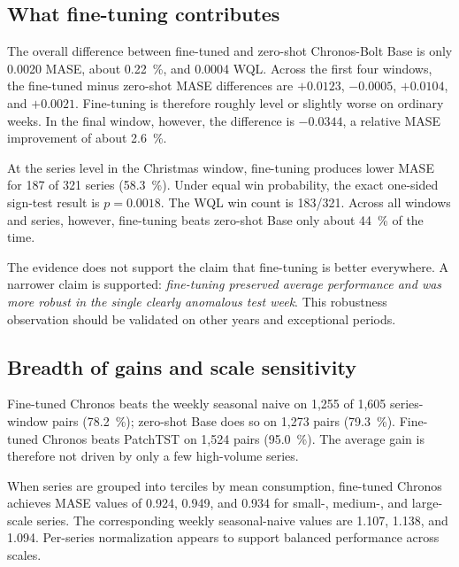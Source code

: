 \documentclass[11pt,a4paper]{article}
\begin{document}
\subsection{What fine-tuning contributes}

The overall difference between fine-tuned and zero-shot Chronos-Bolt Base is only 0.0020 MASE,
about \SI{0.22}{\percent}, and 0.0004 WQL. Across the first four windows, the fine-tuned minus
zero-shot MASE differences are $+0.0123$, $-0.0005$, $+0.0104$, and $+0.0021$. Fine-tuning is
therefore roughly level or slightly worse on ordinary weeks. In the final window, however, the
difference is $-0.0344$, a relative MASE improvement of about \SI{2.6}{\percent}.

At the series level in the Christmas window, fine-tuning produces lower MASE for 187 of 321 series
(\SI{58.3}{\percent}). Under equal win probability, the exact one-sided sign-test result is
$p=0.0018$. The WQL win count is 183/321. Across all windows and series, however, fine-tuning beats
zero-shot Base only about \SI{44}{\percent} of the time.

\begin{caution}
  The evidence does not support the claim that fine-tuning is better everywhere. A narrower claim
  is supported: \emph{fine-tuning preserved average performance and was more robust in the single
  clearly anomalous test week}. This robustness observation should be validated on other years and
  exceptional periods.
\end{caution}

\subsection{Breadth of gains and scale sensitivity}

Fine-tuned Chronos beats the weekly seasonal naive on 1,255 of 1,605 series-window pairs
(\SI{78.2}{\percent}); zero-shot Base does so on 1,273 pairs (\SI{79.3}{\percent}). Fine-tuned
Chronos beats PatchTST on 1,524 pairs (\SI{95.0}{\percent}). The average gain is therefore not
driven by only a few high-volume series.

When series are grouped into terciles by mean consumption, fine-tuned Chronos achieves MASE values
of 0.924, 0.949, and 0.934 for small-, medium-, and large-scale series. The corresponding weekly
seasonal-naive values are 1.107, 1.138, and 1.094. Per-series normalization appears to support
balanced performance across scales.
\end{document}

